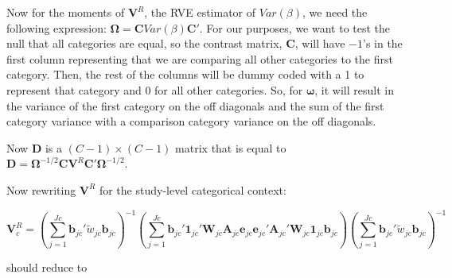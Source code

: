 Now for the moments of $\mathbf{V}^R$, the RVE estimator of $Var(\beta)$, we need the following expression: $\mathbf{\Omega} = \mathbf{C}Var(\beta)\mathbf{C}'$. 
For our purposes, we want to test the null that all categories are equal, so the contrast matrix, $\mathbf{C}$, will have $-1$'s in the first column representing that we are comparing all other categories to the first category. Then, the rest of the columns will be dummy coded with a 1 to represent that category and 0 for all other categories. So, for $\mathbf{\omega}$, it will result in the variance of the first category on the off diagonals and the sum of the first category variance with a comparison category variance on the off diagonals. 




Now $\mathbf{D}$ is a $(C-1) \times (C-1)$ matrix that is equal to $\mathbf{D}= \mathbf{\Omega}^{-1/2}\mathbf{C}\mathbf{V}^R\mathbf{C}'\mathbf{\Omega}^{-1/2}$. 

Now rewriting $\mathbf{V}^R$ for the study-level categorical context: 

\begin{equation}
    \mathbf{V}^R_c = \left(\sum_{j=1}^{Jc}\mathbf{b}_{jc}'\tilde{w}_{jc} \mathbf{b}_{jc} \right)^{-1} \left(\sum_{j=1}^{Jc} \mathbf{b}_{jc}' \mathbf{1}_{jc}'\mathbf{W}_{jc} \mathbf{A}_{jc} \mathbf{e}_{jc} \mathbf{e}_{jc}' \mathbf{A}_{jc}'  \mathbf{W}_{jc}\mathbf{1}_{jc}\mathbf{b}_{jc}   \right) \left(\sum_{j=1}^{Jc}\mathbf{b}_{jc}'\tilde{w}_{jc} \mathbf{b}_{jc} \right)^{-1}
\end{equation}

should reduce to 

